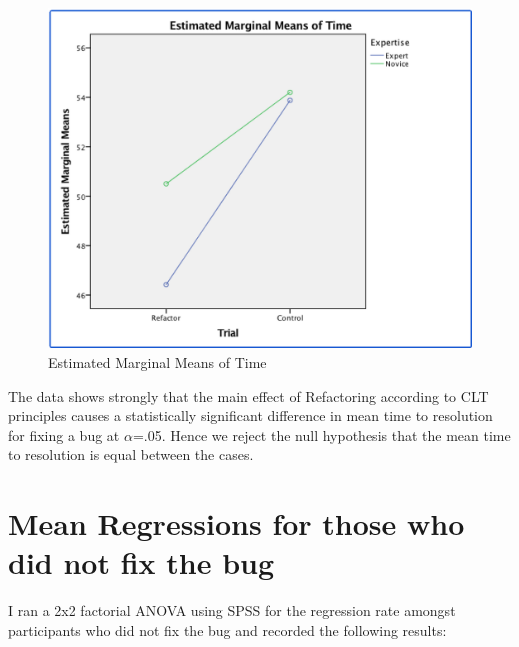 \begin{figure}[H]
	\centering
	\includegraphics[scale = .5]{estimatedMarginalMeansOfTime}
	\caption{Estimated Marginal Means of Time}
\end{figure}

The data shows strongly that the main effect of Refactoring according to CLT principles causes a statistically significant difference in mean time to resolution for fixing a bug at $\alpha$=.05. Hence we reject the null hypothesis that the mean time to resolution is equal between the cases.

\section{Mean Regressions for those who did not fix the bug}

I ran a 2x2 factorial ANOVA using SPSS for the regression rate amongst participants who did not fix the bug and recorded the following results:

